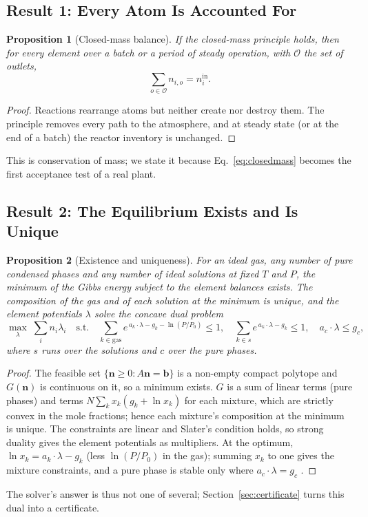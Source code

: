\documentclass[11pt,a4paper]{article}
\theoremstyle{definition}
\theoremstyle{plain}
\newtheorem{proposition}{Proposition}[section]
\theoremstyle{remark}
\begin{document}
\subsection{Result 1: Every Atom Is Accounted For}
\begin{proposition}[Closed-mass balance]\label{prop:closedmass}
If the closed-mass principle holds, then for every element over a batch or a period of steady operation, with $\mathcal{O}$ the set of outlets,
\begin{equation}\label{eq:closedmass}
\textstyle\sum_{o\in\mathcal{O}} n_{i,o} = n_i^{\mathrm{in}}.
\end{equation}
\end{proposition}
\begin{proof}
Reactions rearrange atoms but neither create nor destroy them. The principle removes every path to the atmosphere, and at steady state (or at the end of a batch) the reactor inventory is unchanged.
\end{proof}
This is conservation of mass; we state it because Eq.~\ref{eq:closedmass} becomes the first acceptance test of a real plant.

\subsection{Result 2: The Equilibrium Exists and Is Unique}
\begin{proposition}[Existence and uniqueness]\label{prop:unique}
For an ideal gas, any number of pure condensed phases and any number of ideal solutions at fixed $T$ and $P$, the minimum of the Gibbs energy subject to the element balances exists. The composition of the gas and of each solution at the minimum is unique, and the element potentials $\lambda$ solve the concave dual problem
\begin{equation}\label{eq:dual}
\max_{\lambda}\; \textstyle\sum_i n_i\lambda_i \quad \text{s.t.}\quad \sum_{k\in\mathrm{gas}} e^{\,a_k\cdot\lambda - g_k - \ln(P/P_0)} \le 1,\quad \sum_{k\in s} e^{\,a_k\cdot\lambda - g_k}\le 1,\quad a_c\cdot\lambda \le g_c,
\end{equation}
where $s$ runs over the solutions and $c$ over the pure phases.
\end{proposition}
\begin{proof}
The feasible set $\{\mathbf{n}\ge 0 : A\mathbf{n} = \mathbf{b}\}$ is a non-empty compact polytope and $G(\mathbf{n})$ is continuous on it, so a minimum exists. $G$ is a sum of linear terms (pure phases) and terms $N\sum_k x_k(g_k+\ln x_k)$ for each mixture, which are strictly convex in the mole fractions; hence each mixture's composition at the minimum is unique. The constraints are linear and Slater's condition holds, so strong duality gives the element potentials as multipliers. At the optimum, $\ln x_k = a_k\cdot\lambda - g_k$ (less $\ln(P/P_0)$ in the gas); summing $x_k$ to one gives the mixture constraints, and a pure phase is stable only where $a_c\cdot\lambda = g_c$ \citep{gordon1994}.
\end{proof}
The solver's answer is thus not one of several; Section~\ref{sec:certificate} turns this dual into a certificate.
\end{document}
